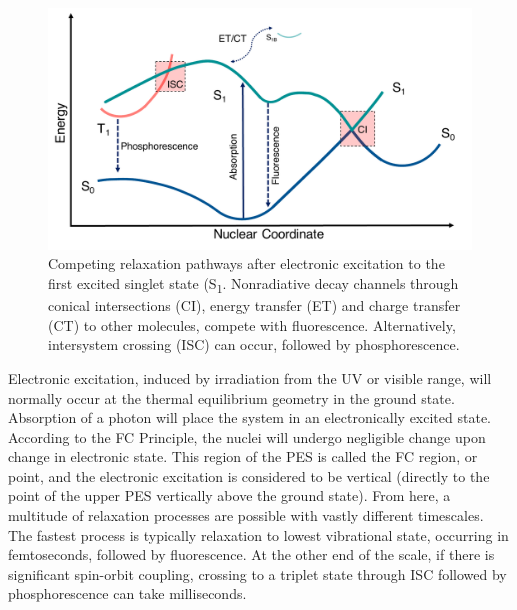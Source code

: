 \begin{figure}[t]
\centering
  \includegraphics[width=0.8\linewidth]{2Theory/Jablonski.pdf}
  \caption[Relaxation pathways post electronic excitation.]{Competing relaxation pathways after electronic excitation to the first excited singlet state (S\textsubscript{1}. Nonradiative decay channels through conical intersections (CI), energy transfer (ET) and charge transfer (CT) to other molecules, compete with fluorescence. Alternatively, intersystem crossing (ISC) can occur, followed by phosphorescence.}
  \label{figure: Jablonski}
\end{figure}

Electronic excitation, induced by irradiation from the \ac{UV} or visible range, will normally occur at the thermal equilibrium geometry in the ground state. Absorption of a photon will place the system in an electronically excited state. According to the \ac{FC} Principle, the nuclei will undergo negligible change upon change in electronic state. This region of the \ac{PES} is called the \ac{FC} region, or point, and the electronic excitation is considered to be vertical (directly to the point of the upper \ac{PES} vertically above the ground state). From here, a multitude of relaxation processes are possible with vastly different timescales. The fastest process is typically relaxation to lowest vibrational state, occurring in femtoseconds, followed by fluorescence. At the other end of the scale, if there is significant spin-orbit coupling, crossing to a triplet state through \ac{ISC} followed by phosphorescence can take milliseconds. 

